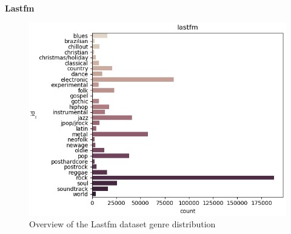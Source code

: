 \textbf{Lastfm}
\begin{figure}[th]
    \centering
    \includegraphics[width=1.0\textwidth]{Figures/lastfm_dist.png}
    \decoRule
    \caption[Lastfm distribution]{Overview of the Lastfm dataset genre distribution}
    \label{fig:lastfmdistfig}
\end{figure}
